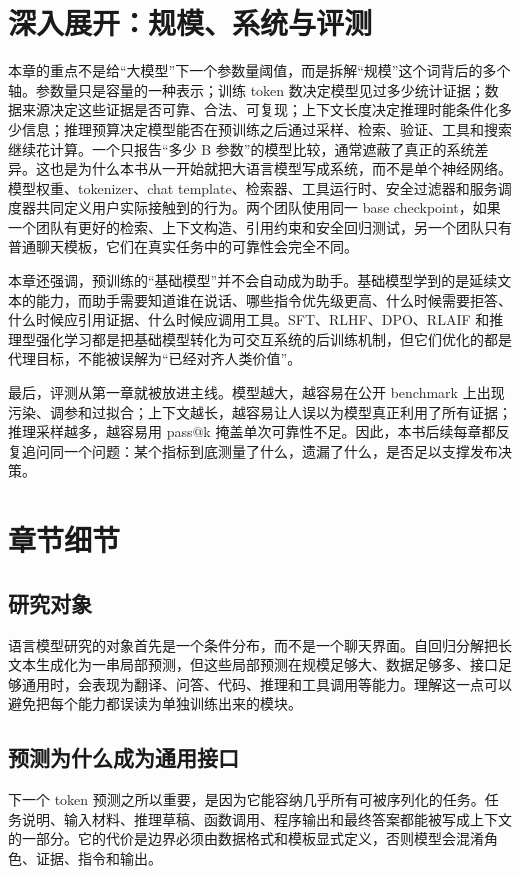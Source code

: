 \documentclass[UTF8,zihao=-4,openany]{ctexbook}
\begin{document}
\section{深入展开：规模、系统与评测}
本章的重点不是给“大模型”下一个参数量阈值，而是拆解“规模”这个词背后的多个轴。参数量只是容量的一种表示；训练 token 数决定模型见过多少统计证据；数据来源决定这些证据是否可靠、合法、可复现；上下文长度决定推理时能条件化多少信息；推理预算决定模型能否在预训练之后通过采样、检索、验证、工具和搜索继续花计算。一个只报告“多少 B 参数”的模型比较，通常遮蔽了真正的系统差异。这也是为什么本书从一开始就把大语言模型写成系统，而不是单个神经网络。模型权重、tokenizer、chat template、检索器、工具运行时、安全过滤器和服务调度器共同定义用户实际接触到的行为。两个团队使用同一 base checkpoint，如果一个团队有更好的检索、上下文构造、引用约束和安全回归测试，另一个团队只有普通聊天模板，它们在真实任务中的可靠性会完全不同。

本章还强调，预训练的“基础模型”并不会自动成为助手。基础模型学到的是延续文本的能力，而助手需要知道谁在说话、哪些指令优先级更高、什么时候需要拒答、什么时候应引用证据、什么时候应调用工具。SFT、RLHF、DPO、RLAIF 和推理型强化学习都是把基础模型转化为可交互系统的后训练机制，但它们优化的都是代理目标，不能被误解为“已经对齐人类价值”。

最后，评测从第一章就被放进主线。模型越大，越容易在公开 benchmark 上出现污染、调参和过拟合；上下文越长，越容易让人误以为模型真正利用了所有证据；推理采样越多，越容易用 pass@k 掩盖单次可靠性不足。因此，本书后续每章都反复追问同一个问题：某个指标到底测量了什么，遗漏了什么，是否足以支撑发布决策。

\section{章节细节}
\subsection{研究对象}
语言模型研究的对象首先是一个条件分布，而不是一个聊天界面。自回归分解把长文本生成化为一串局部预测，但这些局部预测在规模足够大、数据足够多、接口足够通用时，会表现为翻译、问答、代码、推理和工具调用等能力。理解这一点可以避免把每个能力都误读为单独训练出来的模块。

\subsection{预测为什么成为通用接口}
下一个 token 预测之所以重要，是因为它能容纳几乎所有可被序列化的任务。任务说明、输入材料、推理草稿、函数调用、程序输出和最终答案都能被写成上下文的一部分。它的代价是边界必须由数据格式和模板显式定义，否则模型会混淆角色、证据、指令和输出。
\end{document}

